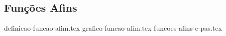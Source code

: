 \subsection{Funções Afins}
\label{sec:funcoes-afins}

{definicao-funcao-afim.tex}
{grafico-funcao-afim.tex}
{funcoes-afins-e-pas.tex}